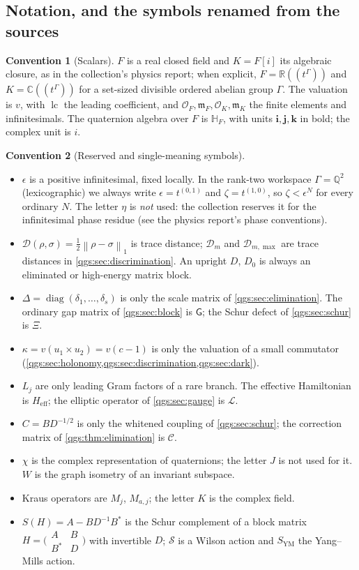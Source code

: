 \documentclass[11pt,oneside]{article}
\numberwithin{equation}{section}
\theoremstyle{plain}
\theoremstyle{definition}
\newtheorem{convention}[convention]{Convention}
\theoremstyle{remark}
\newcommand{\R}{\mathbb R}
\newcommand{\C}{\mathbb C}
\newcommand{\Q}{\mathbb Q}
\newcommand{\HF}{\mathbb H_F}
\newcommand{\OO}{\mathcal O}
\newcommand{\mm}{\mathfrak m}
\newcommand{\TD}{\mathcal D}
\newcommand{\qi}{\mathbf i}
\newcommand{\qj}{\mathbf j}
\newcommand{\qk}{\mathbf k}
\newcommand{\Gap}{\mathsf G}
\newcommand{\Heff}{H_{\mathrm{eff}}}
\newcommand{\Corr}{\mathcal C}
\newcommand{\Lop}{\mathcal L}
\newcommand{\SYM}{S_{\mathrm{YM}}}
\DeclareMathOperator{\diag}{diag}
\DeclareMathOperator{\lc}{lc}
\newcommand{\norm}[1]{\left\|#1\right\|}
\begin{document}
\subsection{Notation, and the symbols renamed from the sources}\label{qgs:sec:notation}
\begin{convention}[Scalars]\label{qgs:conv:scalars}
$F$ is a real closed field and $K=F[i]$ its algebraic closure, as in the collection's physics report; when explicit, $F=\R((t^\Gamma))$ and $K=\C((t^\Gamma))$ for a set-sized divisible ordered abelian group $\Gamma$. The valuation is $v$, with $\lc$ the leading coefficient, and $\OO_F,\mm_F,\OO_K,\mm_K$ the finite elements and infinitesimals. The quaternion algebra over $F$ is $\HF$, with units $\qi,\qj,\qk$ in bold; the complex unit is $i$.
\end{convention}

\begin{convention}[Reserved and single-meaning symbols]\label{qgs:conv:symbols}
\begin{itemize}
\item $\epsilon$ is a positive infinitesimal, fixed locally. In the rank-two workspace $\Gamma=\Q^2$ (lexicographic) we always write $\epsilon=t^{(0,1)}$ and $\zeta=t^{(1,0)}$, so $\zeta<\epsilon^N$ for every ordinary $N$. The letter $\eta$ is \emph{not} used: the collection reserves it for the infinitesimal phase residue (see the physics report's phase conventions).
\item $\TD(\rho,\sigma)=\tfrac12\norm{\rho-\sigma}_1$ is trace distance; $\TD_m$ and $\TD_{m,\max}$ are trace distances in \cref{qgs:sec:discrimination}. An upright $D$, $D_0$ is always an eliminated or high-energy matrix block.
\item $\Delta=\diag(\delta_1,\ldots,\delta_s)$ is only the scale matrix of \cref{qgs:sec:elimination}. The ordinary gap matrix of \cref{qgs:sec:block} is $\Gap$; the Schur defect of \cref{qgs:sec:schur} is $\Xi$.
\item $\kappa=v(u_1\times u_2)=v(c-1)$ is only the valuation of a small commutator (\cref{qgs:sec:holonomy,qgs:sec:discrimination,qgs:sec:dark}).
\item $L_j$ are only leading Gram factors of a rare branch. The effective Hamiltonian is $\Heff$; the elliptic operator of \cref{qgs:sec:gauge} is $\Lop$.
\item $C=BD^{-1/2}$ is only the whitened coupling of \cref{qgs:sec:schur}; the correction matrix of \cref{qgs:thm:elimination} is $\Corr$.
\item $\chi$ is the complex representation of quaternions; the letter $J$ is not used for it. $W$ is the graph isometry of an invariant subspace.
\item Kraus operators are $M_j$, $M_{a,j}$; the letter $K$ is the complex field.
\item $S(H)=A-BD^{-1}B^*$ is the Schur complement of a block matrix $H=\bigl(\begin{smallmatrix}A&B\\B^*&D\end{smallmatrix}\bigr)$ with invertible $D$; $\mathcal S$ is a Wilson action and $\SYM$ the Yang--Mills action.
\end{itemize}
\end{convention}
\end{document}
